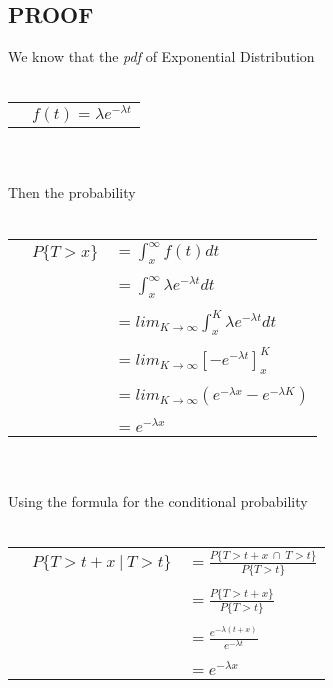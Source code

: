\documentclass[]{panel}
\begin{document}
\subsection*{PROOF}
We know that the \textit{pdf} of Exponential Distribution
\\ \\
\begin{tabular}{l l}
    & $f(t) = \lambda e^{-\lambda t}$ \\
\end{tabular}
\\ \\
Then the probability
\\ \\
\begin{tabular}{l l l}
    & $P\{ T>x \} $&$= \int_x^\infty f(t)dt$ \\
    &&\\
    &&$ = \int_x^\infty \lambda e^{-\lambda t}dt $ \\
    &&\\
    &&$ = lim_{K \rightarrow \infty} \int_x^K \lambda e^{-\lambda t}dt  $ \\
    &&\\
    &&$ = lim_{K \rightarrow \infty} [-e^{-\lambda t}]_x^K $ \\
    &&\\
    &&$ = lim_{K \rightarrow \infty} (e^{-\lambda x}-e^{-\lambda K} )$ \\
    &&\\
    &&$ = e^{-\lambda x}$ \\
\end{tabular}
\\ \\
Using the formula for the conditional probability
\\ \\
\begin{tabular}{l l l}
    & $P\{ T>t+x\ |\ T>t \} $&$= \frac{P\{ T>t+x\ \cap\ T>t \}}{P\{T>t\}}$ \\
    &&\\
    &&$ = \frac{P\{ T>t+x \}}{P\{T>t\}} $ \\
    &&\\
    &&$ = \frac{e^{-\lambda (t+x)}}{e^{-\lambda t}} $\\
    &&\\
    &&$ = e^{-\lambda x}$ \\
\end{tabular}
\end{document}

